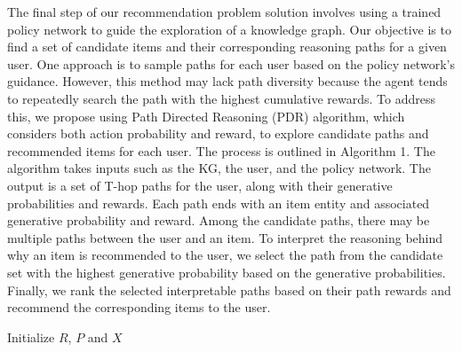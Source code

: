 \documentclass[11pt]{article}
\begin{document}
The final step of our recommendation problem solution involves using a trained policy network to guide the exploration of a knowledge graph. Our objective is to find a set of candidate items and their corresponding reasoning paths for a given user. One approach is to sample paths for each user based on the policy network's guidance. However, this method may lack path diversity because the agent tends to repeatedly search the path with the highest cumulative rewards. To address this, we propose using Path Directed Reasoning (PDR) algorithm, which considers both action probability and reward, to explore candidate paths and recommended items for each user. The process is outlined in Algorithm 1. The algorithm takes inputs such as the KG, the user, and the policy network. The output is a set of T-hop paths for the user, along with their generative probabilities and rewards. Each path ends with an item entity and associated generative probability and reward. Among the candidate paths, there may be multiple paths between the user and an item. To interpret the reasoning behind why an item is recommended to the user, we select the path from the candidate set with the highest generative probability based on the generative probabilities. Finally, we rank the selected interpretable paths based on their path rewards and recommend the corresponding items to the user.


{}

\begin{algorithm}[hbt!]
\caption{Path Directed Reasoning (PDR) Algorithm }\label{alg:PDR}
Initialize $R$, $P$ and $X$\;
\end{algorithm}
\end{document}
